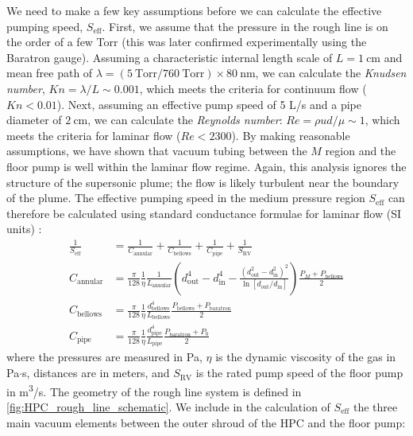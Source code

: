 We need to make a few key assumptions before we can calculate the effective pumping speed, $S_{\textrm{eff}}$. First, we assume that the pressure in the rough line is on the order of a few Torr (this was later confirmed experimentally using the Baratron gauge). Assuming a characteristic internal length scale of $L = 1 \ \textrm{cm}$ and mean free path of ${\lambda = (5 \ \textrm{Torr}/760 \ \textrm{Torr}) \times 80 \ \textrm{nm}}$, we can calculate the \textit{Knudsen number}, $Kn = \lambda / L \sim 0.001$, which meets the criteria for continuum flow ($Kn < 0.01$). Next, assuming an effective pump speed of 5 L/s and a pipe diameter of $2 \ \textrm{cm}$, we can calculate the \textit{Reynolds number}: $Re = \rho u d / \mu \sim 1$, which meets the criteria for laminar flow ($Re < 2300$). By making reasonable assumptions, we have shown that vacuum tubing between the $M$ region and the floor pump is well within the laminar flow regime. Again, this analysis ignores the structure of the supersonic plume; the flow is likely turbulent near the boundary of the plume. The effective pumping speed in the medium pressure region $S_{\textrm{eff}}$ can therefore be calculated using standard conductance formulae for laminar flow (SI units) \cite{joustenHandbookVacuumTechnology2016}:
\begin{equation}
\begin{aligned}
\frac{1}{S_{\textrm{eff}}} &= \frac{1}{C_{\textrm{annular}}} + \frac{1}{C_{\textrm{bellows}}} + \frac{1}{C_{\textrm{pipe}}} + \frac{1}{S_{\textrm{RV}}} \\
C_{\textrm{annular}} &= \frac{\pi}{128} \frac{1}{\eta} \frac{1}{L_{\textrm{annular}}} \left( d_{\textrm{out}}^4 - d_{\textrm{in}}^4 - \frac{(d_{\textrm{out}}^2 - d_{\textrm{in}}^2)^2}{\ln \left[d_{\textrm{out}}/d_{\textrm{in}}\right]} \right) \frac{P_M + P_{\textrm{bellows}}}{2} \\
C_{\textrm{bellows}} &= \frac{\pi}{128} \frac{1}{\eta} \frac{d_{\textrm{bellows}}^4}{L_{\textrm{bellows}}} \frac{P_{\textrm{bellows}} + P_{\textrm{baratron}}}{2} \\
C_{\textrm{pipe}} &= \frac{\pi}{128} \frac{1}{\eta} \frac{d_{\textrm{pipe}}^4}{L_{\textrm{pipe}}} \frac{P_{\textrm{baratron}} + P_0}{2}
\end{aligned}
\label{eqn:HPC-Seff-equations}
\end{equation}
where the pressures are measured in Pa, $\eta$ is the dynamic viscosity of the gas in Pa$\cdot$s, distances are in meters, and $S_{\textrm{RV}}$ is the rated pump speed of the floor pump in m\textsuperscript{3}/s. The geometry of the rough line system is defined in \cref{fig:HPC_rough_line_schematic}. We include in the calculation of $S_{\textrm{eff}}$ the three main vacuum elements between the outer shroud of the HPC and the floor pump:
